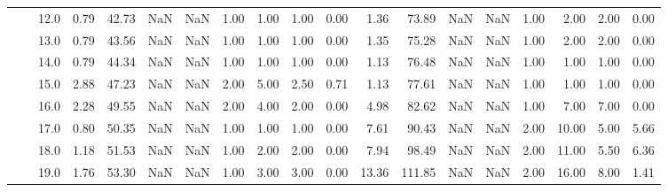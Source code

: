 \begin{tabular}{lllrrrrrrrrrrrrrrrr}
       &     & 12.0 &      0.79 &      42.73 &               NaN &                NaN &  1.00 &   1.00 &             1.00 &                         0.00 &      1.36 &      73.89 &               NaN &                NaN & 1.00 &   2.00 &             2.00 &                         0.00 \\
       &     & 13.0 &      0.79 &      43.56 &               NaN &                NaN &  1.00 &   1.00 &             1.00 &                         0.00 &      1.35 &      75.28 &               NaN &                NaN & 1.00 &   2.00 &             2.00 &                         0.00 \\
       &     & 14.0 &      0.79 &      44.34 &               NaN &                NaN &  1.00 &   1.00 &             1.00 &                         0.00 &      1.13 &      76.48 &               NaN &                NaN & 1.00 &   1.00 &             1.00 &                         0.00 \\
       &     & 15.0 &      2.88 &      47.23 &               NaN &                NaN &  2.00 &   5.00 &             2.50 &                         0.71 &      1.13 &      77.61 &               NaN &                NaN & 1.00 &   1.00 &             1.00 &                         0.00 \\
       &     & 16.0 &      2.28 &      49.55 &               NaN &                NaN &  2.00 &   4.00 &             2.00 &                         0.00 &      4.98 &      82.62 &               NaN &                NaN & 1.00 &   7.00 &             7.00 &                         0.00 \\
       &     & 17.0 &      0.80 &      50.35 &               NaN &                NaN &  1.00 &   1.00 &             1.00 &                         0.00 &      7.61 &      90.43 &               NaN &                NaN & 2.00 &  10.00 &             5.00 &                         5.66 \\
       &     & 18.0 &      1.18 &      51.53 &               NaN &                NaN &  1.00 &   2.00 &             2.00 &                         0.00 &      7.94 &      98.49 &               NaN &                NaN & 2.00 &  11.00 &             5.50 &                         6.36 \\
       &     & 19.0 &      1.76 &      53.30 &               NaN &                NaN &  1.00 &   3.00 &             3.00 &                         0.00 &     13.36 &     111.85 &               NaN &                NaN & 2.00 &  16.00 &             8.00 &                         1.41 \\

\end{tabular}
